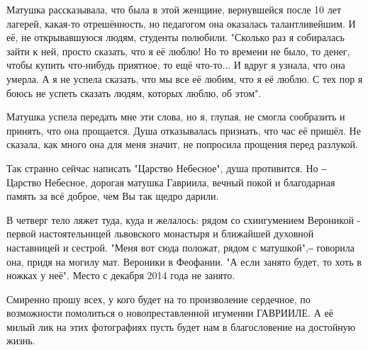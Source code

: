 Матушка рассказывала, что была в этой женщине, вернувшейся после 10 лет
лагерей, какая-то отрешённость, но педагогом она оказалась талантливейшим. И
её, не открывавшуюся людям, студенты полюбили. "Сколько раз я собиралась зайти
к ней, просто сказать, что я её люблю! Но то времени не было, то денег, чтобы
купить что-нибудь приятное, то ещё что-то... И вдруг я узнала, что она умерла.
А я не успела сказать, что мы все её любим, что я её люблю. С тех пор я боюсь
не успеть сказать людям, которых люблю, об этом".

Матушка успела передать мне эти слова, но я, глупая, не смогла сообразить и
принять, что она прощается. Душа отказывалась признать, что час её пришёл. Не
сказала, как много она для меня значит, не попросила прощения перед разлукой.

Так странно сейчас написать "Царство Небесное", душа противится. Но ‒ Царство
Небесное, дорогая матушка Гавриила, вечный покой и благодарная память за всё
доброе, чем Вы так щедро дарили. 

В четверг тело ляжет туда, куда и желалось: рядом со схиигумением Вероникой -
первой настоятельницей львовского монастыря и ближайшей духовной наставницей и
сестрой. "Меня вот сюда положат, рядом с матушкой",‒ говорила она, придя на
могилу мат. Вероники в Феофании. "А если занято будет, то хоть в ножках у неё".
Место с декабря 2014 года не занято.

Смиренно прошу всех, у кого будет на то произволение сердечное, по возможности
помолиться о новопреставленной игумении ГАВРИИЛЕ. А её милый лик на этих
фотографиях пусть будет нам в благословение на достойную жизнь.
